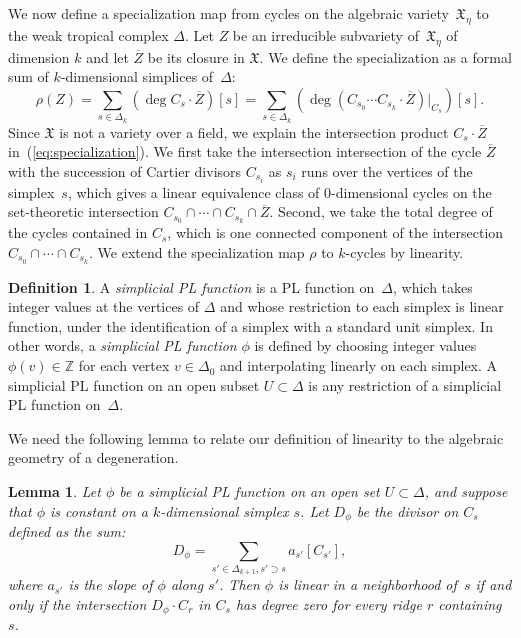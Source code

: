 \documentclass[11pt,reqno]{amsart}
\newtheorem{lem}[thm]{Lemma}
\theoremstyle{definition}
\newtheorem{defn}[thm]{Definition}
\newcommand{\defi}[1]{\emph{#1}}
\newcommand{\X}{\mathfrak X}
\newcommand{\ZZ}{\mathbb Z}
\begin{document}
We now define a specialization map from cycles on the algebraic
variety~$\X_\eta$ to the weak tropical complex $\Delta$. Let $Z$ be an
irreducible subvariety of~$\X_\eta$ of dimension $k$ and let $\overline Z$ be
its closure in $\X$. We define the specialization as a formal sum of
$k$-dimensional simplices of~$\Delta$:
\begin{equation}\label{eq:specialization}
\rho(Z) = \sum_{s \in \Delta_k} (\deg C_s \cdot \overline Z ) [s]
= \sum_{s \in \Delta_k}
(\deg (C_{s_0} \cdots C_{s_{k}} \cdot \overline Z)\vert_{C_s})[s].
\end{equation}
Since $\X$ is not a variety over a field, we explain the intersection product
$C_s \cdot \overline Z$ in~(\ref{eq:specialization}). We first take the
intersection intersection of the cycle $\overline Z$ with the succession of
Cartier divisors $C_{s_i}$ as $s_i$ runs over the vertices of the simplex~$s$,
which gives a linear equivalence class of 0-dimensional cycles on the
set-theoretic intersection $C_{s_0} \cap \cdots \cap C_{s_{k}} \cap \overline
Z$. Second, we take the total degree of the
cycles contained in $C_s$, which is one connected component of the intersection
$C_{s_0} \cap \cdots \cap C_{s_{k}}$. We extend the specialization map $\rho$ to
$k$-cycles by linearity.

\begin{defn}\label{d:simplicial}
A \defi{simplicial PL function} is a PL function on~$\Delta$, which takes
integer values at the vertices of $\Delta$ and  whose restriction
to each simplex is linear function, under the identification of a simplex with a
standard unit simplex. In other words, a \defi{simplicial PL function} $\phi$ is
defined by choosing integer values $\phi(v) \in \ZZ$ for each vertex $v \in
\Delta_0$ and interpolating linearly on each simplex. A simplicial PL function
on an open subset $U \subset \Delta$ is any restriction of a simplicial PL
function on~$\Delta$.
\end{defn}

We need the following lemma to relate our definition of linearity to the
algebraic geometry of a degeneration.

\begin{lem}\label{l:linear-degree-zero}
Let $\phi$ be a simplicial PL function on an open set $U \subset \Delta$, and
suppose that $\phi$
is constant on a $k$-dimensional simplex $s$. Let $D_\phi$ be the divisor on
$C_s$ defined as the sum:
\begin{equation*}
D_\phi = \sum_{s' \in \Delta_{k+1}, s' \supset s}
a_{s'}[C_{s'}],
\end{equation*}
where $a_{s'}$ is the slope of $\phi$ along $s'$. Then $\phi$ is linear in a
neighborhood of~$s$ if and only if the intersection $D_\phi \cdot C_r$ in $C_s$
has degree zero for every ridge $r$ containing $s$.
\end{lem}
\end{document}
